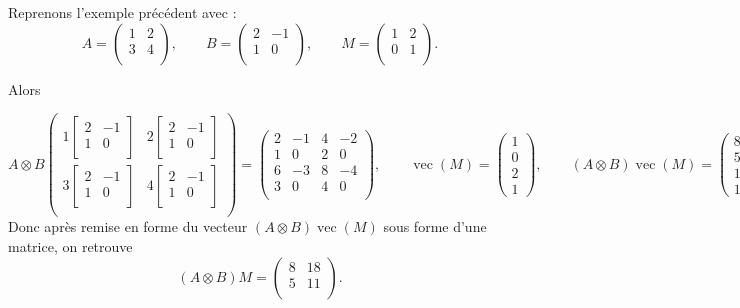 \documentclass[11pt,class=report,crop=false]{standalone}
\begin{document}
\begin{exemple}
Reprenons l'exemple précédent avec :
$$A = 
\begin{pmatrix}
	1 & 2 \\ 
	3 & 4 \\
\end{pmatrix},
\qquad
B = 
\begin{pmatrix}
	2 & -1 \\
	1 & 0 \\
\end{pmatrix},
\qquad
M = 
\begin{pmatrix}
	1 & 2 \\
	0 & 1 \\
\end{pmatrix}.
$$

Alors 

\[
A \otimes B
\begin{pmatrix}
	1\begin{bmatrix}	2 & -1 \\1 & 0 \\\end{bmatrix}   & 
	2\begin{bmatrix}	2 & -1 \\1 & 0 \\\end{bmatrix}   \\	 
	3\begin{bmatrix}	2 & -1 \\1 & 0 \\\end{bmatrix}   & 
    4\begin{bmatrix}	2 & -1 \\1 & 0 \\\end{bmatrix}   \\	 	
\end{pmatrix}
= 
\begin{pmatrix}
2 & -1 & 4 & -2 \\
1 &  0 & 2 & 0 \\
6 & -3 & 8 & -4 \\
3 & 0 & 4 & 0 \\	
\end{pmatrix},
\qquad 	
\operatorname{vec}(M) 
= \begin{pmatrix} 1 \\ 0 \\ 2 \\ 1 \end{pmatrix},
\qquad 
(A \otimes B) \operatorname{vec}(M) 
= \begin{pmatrix} 8 \\ 5 \\ 18 \\ 11 \end{pmatrix}.
\]
Donc après remise en forme du vecteur $(A \otimes B) \operatorname{vec}(M)$ sous forme d'une matrice, on retrouve 
$$
(A \otimes B) M = 
\begin{pmatrix}
	8 & 18 \\ 
	5 & 11 \\
\end{pmatrix}.
$$
\end{exemple}
\end{document}
